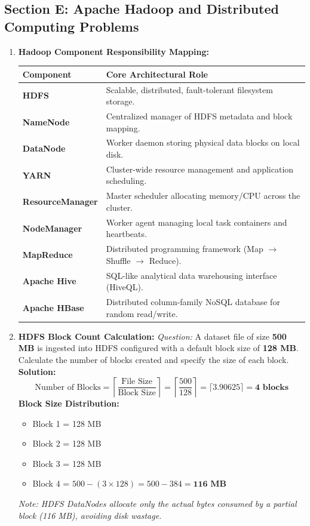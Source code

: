 \subsection{Section E: Apache Hadoop and Distributed Computing Problems}

\begin{enumerate}[resume*]
\item \textbf{Hadoop Component Responsibility Mapping:}
\begin{table}[htbp]
\centering
\small
\begin{tabularx}{0.85\textwidth}{l X}
\toprule
\textbf{Component} & \textbf{Core Architectural Role} \\
\midrule
\textbf{HDFS} & Scalable, distributed, fault-tolerant filesystem storage. \\
\textbf{NameNode} & Centralized manager of HDFS metadata and block mapping. \\
\textbf{DataNode} & Worker daemon storing physical data blocks on local disk. \\
\textbf{YARN} & Cluster-wide resource management and application scheduling. \\
\textbf{ResourceManager} & Master scheduler allocating memory/CPU across the cluster. \\
\textbf{NodeManager} & Worker agent managing local task containers and heartbeats. \\
\textbf{MapReduce} & Distributed programming framework (Map $\to$ Shuffle $\to$ Reduce). \\
\textbf{Apache Hive} & SQL-like analytical data warehousing interface (HiveQL). \\
\textbf{Apache HBase} & Distributed column-family NoSQL database for random read/write. \\
\bottomrule
\end{tabularx}
\end{table}

\item \textbf{HDFS Block Count Calculation:}
\textit{Question:} A dataset file of size \textbf{500 MB} is ingested into HDFS configured with a default block size of \textbf{128 MB}. Calculate the number of blocks created and specify the size of each block. \\
\textbf{Solution:}
\[
\text{Number of Blocks} = \left\lceil \frac{\text{File Size}}{\text{Block Size}} \right\rceil = \left\lceil \frac{500}{128} \right\rceil = \lceil 3.90625 \rceil = \mathbf{4\text{ blocks}}
\]
\textbf{Block Size Distribution:}
\begin{itemize}
    \item Block 1 = 128 MB
    \item Block 2 = 128 MB
    \item Block 3 = 128 MB
    \item Block 4 = $500 - (3 \times 128) = 500 - 384 = \mathbf{116\text{ MB}}$
\end{itemize}
\textit{Note: HDFS DataNodes allocate only the actual bytes consumed by a partial block (116 MB), avoiding disk wastage.}


\end{enumerate}

